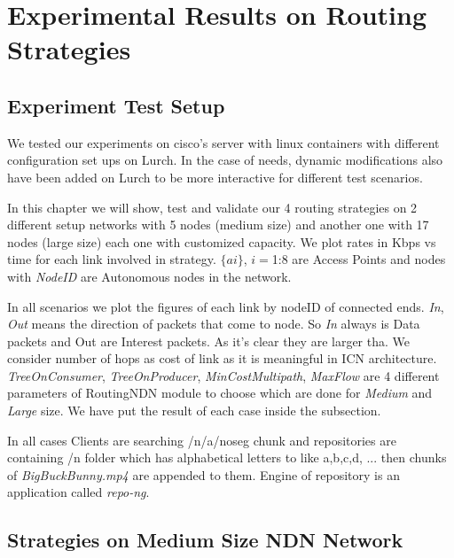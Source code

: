
\chapter{Experimental Results on Routing Strategies} %

\label{expereince}


\section{Experiment Test Setup}
We tested our experiments on cisco's server with linux containers with different configuration set ups on Lurch. In the case of needs, dynamic modifications also have been added on Lurch to be more interactive for different test scenarios.

In this chapter we will show, test and validate our 4 routing strategies on 2 different setup networks with 5 nodes (medium size) and another one with 17 nodes (large size) each one with customized capacity. We plot rates in Kbps vs time for each link involved in strategy. $\{ai\}$, $i=$1:8 are Access Points and nodes with \textit{NodeID} are Autonomous nodes in the network.
   
In all scenarios we plot the figures of each link by nodeID of connected ends. \textit{In}, \textit{Out} means the direction of packets that come to node. So \textit{In} always is Data packets and Out are Interest packets. As it's clear they are larger tha.  We consider number of hops as cost of link as it is meaningful in ICN architecture.
\textit{TreeOnConsumer}, \textit{TreeOnProducer}, \textit{MinCostMultipath}, \textit{MaxFlow} are 4 different parameters of RoutingNDN module to choose which are done for \textit{Medium} and \textit{Large} size. We have put the result of each case inside the subsection.

In all cases Clients are searching /n/a/noseg chunk and repositories are containing /n folder which has alphabetical letters to like a,b,c,d, ... then chunks of \textit{BigBuckBunny.mp4} are appended to them. Engine of repository is an application called \textit{repo-ng}. 

\section{Strategies on Medium Size NDN Network}


